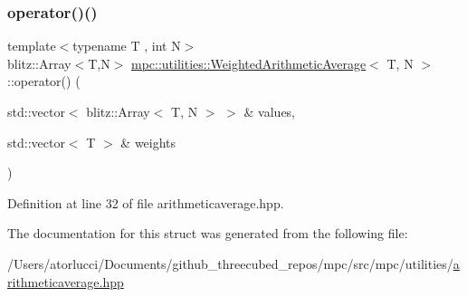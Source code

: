 \subsubsection{\texorpdfstring{operator()()}{operator()()}}
{\footnotesize\ttfamily template$<$typename T , int N$>$ \\
blitz\+::\+Array$<$T,N$>$ \mbox{\hyperlink{structmpc_1_1utilities_1_1_weighted_arithmetic_average}{mpc\+::utilities\+::\+Weighted\+Arithmetic\+Average}}$<$ T, N $>$\+::operator() (\begin{DoxyParamCaption}\item[{std\+::vector$<$ blitz\+::\+Array$<$ T, N $>$ $>$ \&}]{values,  }\item[{std\+::vector$<$ T $>$ \&}]{weights }\end{DoxyParamCaption})\hspace{0.3cm}{\ttfamily [inline]}}



Definition at line 32 of file arithmeticaverage.\+hpp.



The documentation for this struct was generated from the following file\+:\begin{DoxyCompactItemize}
\item 
/\+Users/atorlucci/\+Documents/github\+\_\+threecubed\+\_\+repos/mpc/src/mpc/utilities/\mbox{\hyperlink{arithmeticaverage_8hpp}{arithmeticaverage.\+hpp}}\end{DoxyCompactItemize}
